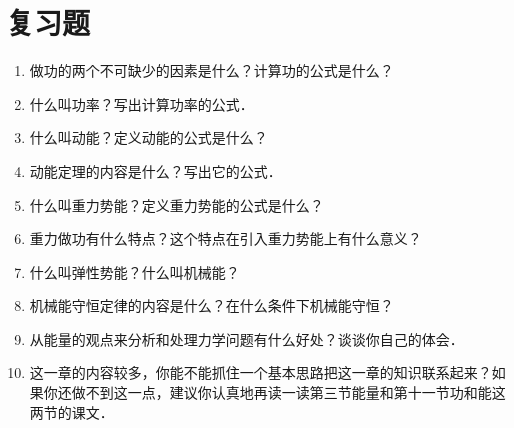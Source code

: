 \section*{复习题}
\begin{enumerate}
    \item 做功的两个不可缺少的因素是什么？计算功的公式是什么？
    \item 什么叫功率？写出计算功率的公式．
    \item 什么叫动能？定义动能的公式是什么？
    \item 动能定理的内容是什么？写出它的公式．
    \item 什么叫重力势能？定义重力势能的公式是什么？
    \item 重力做功有什么特点？这个特点在引入重力势能上有什么意义？
    \item 什么叫弹性势能？什么叫机械能？
    \item 机械能守恒定律的内容是什么？在什么条件下机械能守恒？
    \item 从能量的观点来分析和处理力学问题有什么好处？谈谈你自己的体会．
    \item 这一章的内容较多，你能不能抓住一个基本思路把这一章的知识联系起来？如果你还做不到这一点，建议你认真地再读一读第三节能量和第十一节功和能这两节的课文．
\end{enumerate}
\newpage
